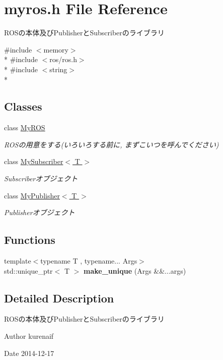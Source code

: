\section{myros.\-h File Reference}
\label{myros_8h}


R\-O\-Sの本体及び\-Publisherと\-Subscriberのライブラリ  


{\ttfamily \#include $<$memory$>$}\\*
{\ttfamily \#include $<$ros/ros.\-h$>$}\\*
{\ttfamily \#include $<$string$>$}\\*
\subsection*{Classes}
\begin{DoxyCompactItemize}
\item 
class \hyperlink{classMyROS}{My\-R\-O\-S}
\begin{DoxyCompactList}\small\item\em R\-O\-Sの用意をする(いろいろする前に, まずこいつを呼んでください) \end{DoxyCompactList}\item 
class \hyperlink{classMySubscriber}{My\-Subscriber$<$ T $>$}
\begin{DoxyCompactList}\small\item\em Subscriberオブジェクト \end{DoxyCompactList}\item 
class \hyperlink{classMyPublisher}{My\-Publisher$<$ T $>$}
\begin{DoxyCompactList}\small\item\em Publisherオブジェクト \end{DoxyCompactList}\end{DoxyCompactItemize}
\subsection*{Functions}
\begin{DoxyCompactItemize}
\item 
{\footnotesize template$<$typename T , typename... Args$>$ }\\std\-::unique\-\_\-ptr$<$ T $>$ {\bfseries make\-\_\-unique} (Args \&\&...args)\label{myros_8h_a0829a5e90a24afd12645b3d48cd08913}

\end{DoxyCompactItemize}


\subsection{Detailed Description}
R\-O\-Sの本体及び\-Publisherと\-Subscriberのライブラリ \begin{DoxyAuthor}{Author}
kurenaif 
\end{DoxyAuthor}
\begin{DoxyDate}{Date}
2014-\/12-\/17 
\end{DoxyDate}
